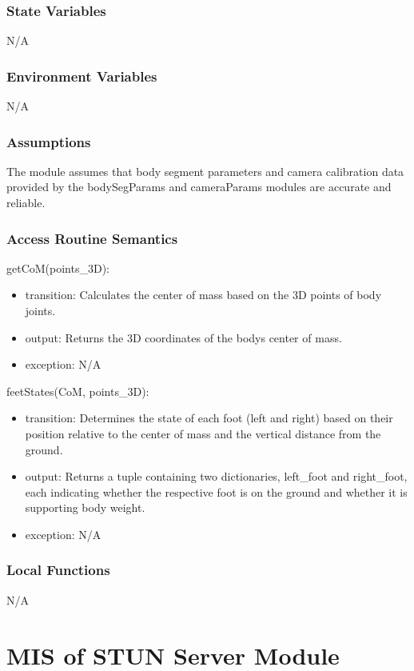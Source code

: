 \documentclass[12pt, titlepage]{article}
\begin{document}
\subsubsection{State Variables}
N/A

\subsubsection{Environment Variables}
N/A

\subsubsection{Assumptions}
The module assumes that body segment parameters and camera calibration data
provided by the bodySegParams and cameraParams modules are accurate and
reliable.

\subsubsection{Access Routine Semantics}

\noindent getCoM(points\_3D):
\begin{itemize}
\item transition: Calculates the center of mass based on the 3D points of body
  joints.
\item output: Returns the 3D coordinates of the bodys center of mass.
\item exception: N/A
\end{itemize}

\noindent feetStates(CoM, points\_3D):
\begin{itemize}
\item transition: Determines the state of each foot (left and right) based on their
  position relative to the center of mass and the vertical distance from the
  ground.
\item output: Returns a tuple containing two dictionaries, left\_foot and
  right\_foot, each indicating whether the respective foot is on the ground and
  whether it is supporting body weight.
\item exception: N/A
\end{itemize}

\subsubsection{Local Functions}
N/A

\section{MIS of STUN Server Module} \label{sec:stunserver}
\end{document}
